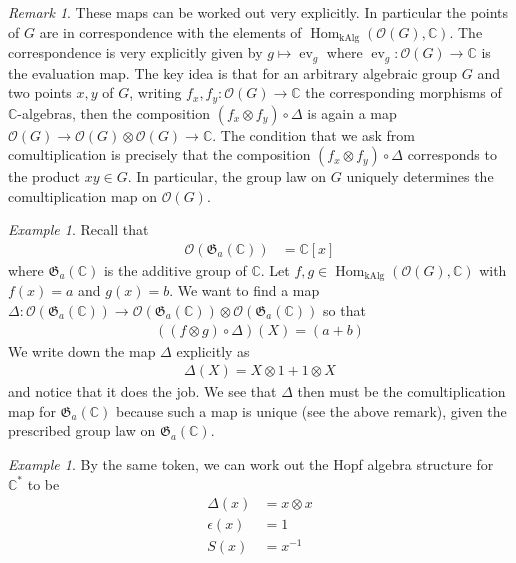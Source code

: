 \documentclass[manuscript, printscheme]{aomart}
\theoremstyle{plain} %
\theoremstyle{definition}
\theoremstyle{remark}
\newtheorem{remark}[equation]{Remark}
\newtheorem{example}[equation]{Example}
\newcommand{\cO}{{\mathcal{O}}}
\DeclareMathOperator{\Hom}{Hom}
\DeclareMathOperator{\kAlg}{kAlg}
\DeclareMathOperator{\ev}{ev}
\newcommand{\C}{\mathbb{C}}
\newcommand{\Ga}{\mf G_a}
\newcommand{\mf}[1]{\mathfrak{#1}}
\newcommand{\inv}[1]{{#1}^{-1}}
\begin{document}
\begin{remark}
	These maps can be worked out very explicitly. In particular the points of $G$ are in correspondence with the elements of $\Hom_{\kAlg}(\cO(G),\C)$.
	The correspondence is very explicitly given by $g\mapsto \ev_g$ where $\ev_g: \cO(G)\to \C$ is the evaluation map.
	The key idea is that for an arbitrary algebraic group $G$ and two points $x,y$ of $G$, writing
	$f_x,f_y: \cO(G)\to \C$ the corresponding morphisms of $\C$-algebras, then the composition $(f_x\otimes f_y)\circ \Delta$ is again a map $\cO(G)\to \cO(G)\otimes \cO(G)\to \C$.
	The condition that we ask from comultiplication is precisely that the composition $(f_x\otimes f_y)\circ \Delta$
	corresponds to the product $xy\in G$. In particular, the group law on $G$ uniquely determines the comultiplication map on $\cO(G)$.
\end{remark}

\begin{example}
	Recall that
	\begin{align*}
		\cO(\Ga(\C)) & = \C[x]
	\end{align*} where $\Ga(\C)$ is the additive group of $\C$.
	Let $f,g\in \Hom_{\kAlg}(\cO(G),\C)$ with $f(x) = a$ and $g(x) = b$.
	We want to find a map $\Delta: \cO(\Ga(\C))\to \cO(\Ga(\C))\otimes \cO(\Ga(\C))$ so that
	\begin{align*}
		((f\otimes g)\circ \Delta)(X) = (a+b)
	\end{align*}
	We write down the map $\Delta$ explicitly as
	\begin{align*}
		\Delta(X) = X\otimes 1 + 1\otimes X
	\end{align*} and notice that it does the job. We see that $\Delta$ then must be the
	comultiplication map for $\Ga(\C)$ because such a map is unique (see the above remark), given the prescribed group law on $\Ga(\C)$.
\end{example}

\begin{example}
	By the same token, we can work out the Hopf algebra structure for $\C^*$ to be
	\begin{align*}
		\Delta(x)   & = x\otimes x \\
		\epsilon(x) & = 1          \\
		S(x)        & = \inv{x}
	\end{align*}
\end{example}
\end{document}
